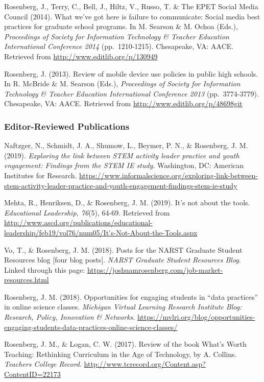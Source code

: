 \documentclass[14,]{article}
\begin{document}
Rosenberg, J., Terry, C., Bell, J., Hiltz, V., Russo, T. \& The EPET
Social Media Council (2014). What we've got here is failure to
communicate: Social media best practices for graduate school programs.
In M. Searson \& M. Ochoa (Eds.), \emph{Proceedings of Society for
Information Technology \& Teacher Education International Conference
2014} (pp.~1210-1215). Chesapeake, VA: AACE. Retrieved from
\url{http://www.editlib.org/p/130949}

Rosenberg, J. (2013). Review of mobile device use policies in public
high schools. In R. McBride \& M. Searson (Eds.), \emph{Proceedings of
Society for Information Technology \& Teacher Education International
Conference 2013} (pp.~3774-3779). Chesapeake, VA: AACE. Retrieved from
\url{http://www.editlib.org/p/48698git}

\hypertarget{editor-reviewed-publications}{%
\subsubsection{Editor-Reviewed
Publications}\label{editor-reviewed-publications}}

Naftzger, N., Schmidt, J. A., Shumow, L., Beymer, P. N., \& Rosenberg,
J. M. (2019). \emph{Exploring the link between STEM activity leader
practice and youth engagement: Findings from the STEM IE study}.
Washington, DC: American Institutes for Research.
\url{https://www.informalscience.org/exploring-link-between-stem-activity-leader-practice-and-youth-engagement-findings-stem-ie-study}

Mehta, R., Henriksen, D., \& Rosenberg, J. M. (2019). It's not about the
tools. \emph{Educational Leadership, 76}(5), 64-69. Retrieved from
\url{http://www.ascd.org/publications/educational-leadership/feb19/vol76/num05/It's-Not-About-the-Tools.aspx}

Vo, T., \& Rosenberg, J. M. (2018). Posts for the NARST Graduate Student
Resources blog {[}four blog posts{]}. \emph{NARST Graduate Student
Resources Blog}. Linked through this page:
\url{https://joshuamrosenberg.com/job-market-resources.html}

Rosenberg, J. M. (2018). Opportunities for engaging students in ``data
practices'' in online science classes. \emph{Michigan Virtual Learning
Research Institute Blog: Research, Policy, Innovation \& Networks}.
\url{https://mvlri.org/blog/opportunities-engaging-students-data-practices-online-science-classes/}

Rosenberg, J. M., \& Logan, C. W. (2017). Review of the book What's
Worth Teaching: Rethinking Curriculum in the Age of Technology, by A.
Collins. \emph{Teachers College Record}.
\url{http://www.tcrecord.org/Content.asp?ContentID=22173}
\end{document}
